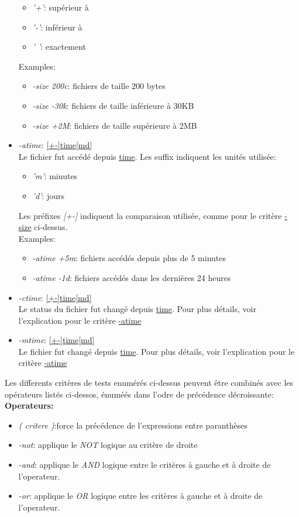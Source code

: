 \documentclass[11pt, a4paper]{article}
\begin{document}
\begin{itemize}
		\begin{itemize}
			\item \textit{'+'}: supérieur à
			\item \textit{'-'}: inférieur à
			\item \textit{' '}: exactement
		\end{itemize}
		Examples:
		\begin{itemize}
			\item \textit{-size 200c}: fichiers de taille 200 bytes		
			\item \textit{-size -30k}: fichiers de taille inférieure à 30KB
			\item \textit{-size +2M}: fichiers de taille supérieure à 2MB
		\end{itemize}
	\item \textit{-atime}: \underline{[+-]time[md]}\\
	Le fichier fut accédé depuis \underline{time}.
	Les suffix indiquent les unités utilisée:
	\begin{itemize}
		\item \textit{'m'}: minutes
		\item \textit{'d'}: jours 
	\end{itemize}
	Les préfixes \textit{[+-]} indiquent la comparaison utilisée, comme pour le critère \underline{-size} ci-dessus.\\
	Examples:
	\begin{itemize}
		\item \textit{-atime +5m}: fichiers accédés depuis plus de 5 minutes
		\item \textit{-atime -1d}: fichiers accédés dans les dernières 24 heures
	\end{itemize}
	\item \textit{-ctime}: \underline{[+-]time[md]}\\
	Le status du fichier fut changé depuis \underline{time}. Pour plus détails, voir l'explication pour le critère \underline{-atime}
	\item \textit{-mtime}: \underline{[+-]time[md]}\\
		Le fichier fut changé depuis \underline{time}. Pour plus détails, voir l'explication pour le critère \underline{-atime}\\		
\end{itemize}


Les differents critères de tests enumérés ci-dessus peuvent être combinés avec les opérateurs listés ci-dessos, énuméés dans l'odre de précédence décroissante:\\
\textbf{Operateurs:}
\begin{itemize}
	\renewcommand\labelitemi{}
	\item \textit{( critere )}:force la précédence de l'expressions entre paranthèses
	\item \textit{-not}: applique le \textit{NOT} logique  au critère de droite
	\item \textit{-and}: applique le \textit{AND} logique entre le critères à gauche et à droite de l'operateur. 
	\item \textit{-or}: applique le \textit{OR} logique  entre les critères à gauche et à droite de l'operateur. 
\end{itemize}
\end{document}
